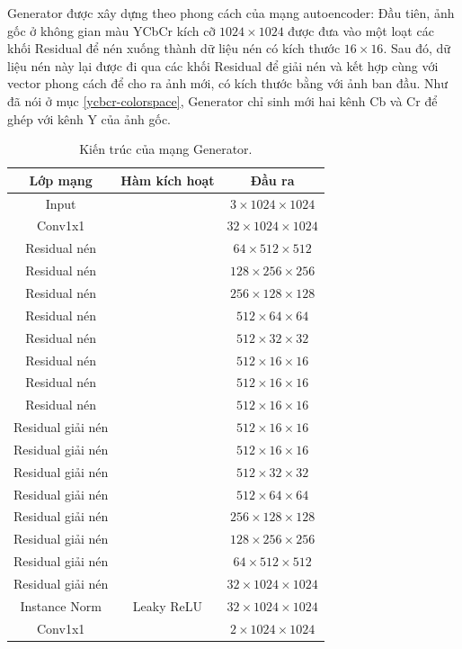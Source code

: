 \documentclass[12pt]{extreport}
\begin{document}
Generator được xây dựng theo phong cách của mạng autoencoder: Đầu tiên, ảnh gốc ở không gian màu YCbCr kích cỡ $ 1024 \times 1024 $ được đưa vào một loạt các khối Residual để nén xuống thành dữ liệu nén có kích thước $ 16 \times 16 $. Sau đó, dữ liệu nén này lại được đi qua các khối Residual để giải nén và kết hợp cùng với vector phong cách để cho ra ảnh mới, có kích thước bằng với ảnh ban đầu. Như đã nói ở mục \ref{ycbcr-colorspace}, Generator chỉ sinh mới hai kênh Cb và Cr để ghép với kênh Y của ảnh gốc.

\begin{table}[H]
    \centering
    \begin{tabular}{c c c}
        Lớp mạng          & Hàm kích hoạt & Đầu ra                         \\
        \hline
        Input             &               & $ 3 \times 1024 \times 1024 $  \\
        \hline
        Conv1x1           &               & $ 32 \times 1024 \times 1024 $ \\
        Residual nén      &               & $ 64 \times 512 \times 512 $   \\
        Residual nén      &               & $ 128 \times 256 \times 256 $  \\
        Residual nén      &               & $ 256 \times 128 \times 128 $  \\
        Residual nén      &               & $ 512 \times 64 \times 64 $    \\
        Residual nén      &               & $ 512 \times 32 \times 32 $    \\
        Residual nén      &               & $ 512 \times 16 \times 16 $    \\
        Residual nén      &               & $ 512 \times 16 \times 16 $    \\
        Residual nén      &               & $ 512 \times 16 \times 16 $    \\
        Residual giải nén &               & $ 512 \times 16 \times 16 $    \\
        Residual giải nén &               & $ 512 \times 16 \times 16 $    \\
        Residual giải nén &               & $ 512 \times 32 \times 32 $    \\
        Residual giải nén &               & $ 512 \times 64 \times 64 $    \\
        Residual giải nén &               & $ 256 \times 128 \times 128 $  \\
        Residual giải nén &               & $ 128 \times 256 \times 256 $  \\
        Residual giải nén &               & $ 64 \times 512 \times 512 $   \\
        Residual giải nén &               & $ 32 \times 1024 \times 1024 $ \\
        Instance Norm     & Leaky ReLU    & $ 32 \times 1024 \times 1024 $ \\
        Conv1x1           &               & $ 2 \times 1024 \times 1024 $  \\
    \end{tabular}
    \caption{Kiến trúc của mạng Generator.}
\end{table}
\end{document}
